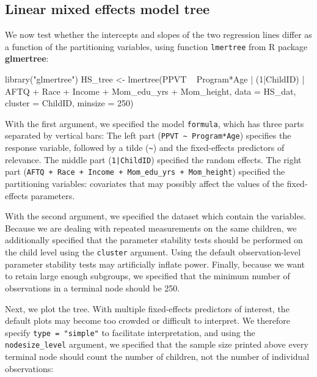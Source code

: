 \documentclass[doc,floatsintext,natbib]{apa7}
\begin{document}

\FloatBarrier
\subsection{Linear mixed effects model tree}

We now test whether the intercepts and slopes of the two regression lines differ as a function of the partitioning variables, using function \verb|lmertree| from R package \textbf{glmertree}:

\begin{Schunk}
\begin{Sinput}
 library("glmertree")
 HS_tree <- lmertree(PPVT ~ Program*Age | (1|ChildID) | AFTQ + Race + 
                       Income + Mom_edu_yrs + Mom_height, 
                     data = HS_dat, cluster = ChildID, minsize = 250)
\end{Sinput}
\end{Schunk}

With the first argument, we specified the model \verb|formula|, which has three parts separated by vertical bars: The left part (\verb|PPVT ~ Program*Age|) specifies the response variable, followed by a tilde (\verb|~|) and the fixed-effects predictors of relevance. The middle part (\texttt{1|ChildID}) specified the random effects. The right part (\verb|AFTQ + Race + Income + Mom_edu_yrs + Mom_height|) specified the partitioning variables: covariates that may possibly affect the values of the fixed-effects parameters. 

With the second argument, we specified the dataset which contain the variables. Because we are dealing with repeated measurements on the same children, we additionally specified that the parameter stability tests should be performed on the child level using the \verb|cluster| argument. Using the default observation-level parameter stability tests may artificially inflate power. Finally, because we want to retain large enough subgroups, we specified that the minimum number of observations in a terminal node should be 250.

Next, we plot the tree. With multiple fixed-effects predictors of interest, the default plots may become too crowded or difficult to interpret. We therefore specify \verb|type = "simple"| to facilitate interpretation, and using the \verb|nodesize_level| argument, we specified that the sample size printed above every terminal node should count the number of children, not the number of individual observations:
\end{document}
